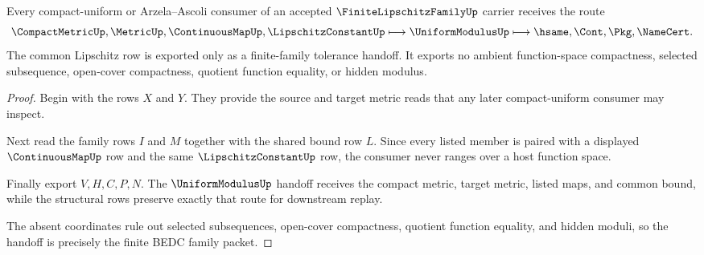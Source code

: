 \begin{theorem}
\label{thm:finite-lipschitz-family-modulus-handoff}
Every compact-uniform or Arzela--Ascoli consumer of an accepted $\FiniteLipschitzFamilyUp$ carrier receives the route
$$
\CompactMetricUp,\MetricUp,\ContinuousMapUp,\LipschitzConstantUp
\longmapsto
\UniformModulusUp
\longmapsto
\hsame,\Cont,\Pkg,\NameCert .
$$
The common Lipschitz row is exported only as a finite-family tolerance handoff. It exports no ambient function-space compactness, selected subsequence, open-cover compactness, quotient function equality, or hidden modulus.
\end{theorem}
\begin{proof}
Begin with the rows $X$ and $Y$. They provide the source and target metric reads that any later compact-uniform consumer may inspect.

Next read the family rows $I$ and $M$ together with the shared bound row $L$. Since every listed member is paired with a displayed $\ContinuousMapUp$ row and the same $\LipschitzConstantUp$ row, the consumer never ranges over a host function space.

Finally export $V,H,C,P,N$. The $\UniformModulusUp$ handoff receives the compact metric, target metric, listed maps, and common bound, while the structural rows preserve exactly that route for downstream replay.

The absent coordinates rule out selected subsequences, open-cover compactness, quotient function equality, and hidden moduli, so the handoff is precisely the finite BEDC family packet.
\end{proof}



